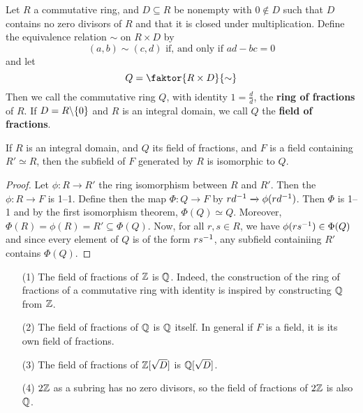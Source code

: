 \begin{definition}
  Let $R$ a commutative ring, and  $D \subseteq R$ be nonempty with $0 \notin
  D$ such that $D$ contains no zero divisors of $R$ and that it is closed
  under multiplication. Define the equivalence relation $\sim$ on  $R \times D$
  by
  \begin{equation*}
    (a,b) \sim (c,d) \text{ if, and only if } ad-bc=0
  \end{equation*}
  and let
  \begin{equation*}
    Q=\faktor{R \times D}{\sim}
  \end{equation*}
  Then we call the commutative ring $Q$, with identity  $1=\frac{d}{d}$, the
  \textbf{ring of fractions} of $R$. If $D=R \backslash \{0\}$ and $R$ is an
  integral domain, we call  $Q$ the \textbf{field of fractions}.
\end{definition}

\begin{lemma}\label{lemma_5.6.3}
  If $R$ is an integral domain, and  $Q$ its field of fractions, and  $F$ is a
  field containing  $R' \simeq R$, then the subfield of $F$ generated by $R$
  is isomorphic to $Q$.
\end{lemma}
\begin{proof}
  Let $\phi:R \xrightarrow{} R'$ the ring isomorphism between $R$ and  $R'$.
  Then the  $\phi:R \xrightarrow{} F$ is 1--1. Define then the map $\Phi:Q
  \xrightarrow{} F$ by $rd^{-1} \xrightarrow{} \phi(rd^{-1})$. Then $\Phi$
  is 1--1 and by the first isomorphism theorem, $\Phi(Q) \simeq Q$. Moreover,
  $\Phi(R)=\phi(R)=R' \subseteq \Phi(Q)$. Now, for all $r,s \in R$, we have
  $\phi(rs^{-1}) \in \Phi(Q)$ and since every element of $Q$ is of the form
  $rs^{-1}$, any subfield containiing $R'$ contains  $\Phi(Q)$.
\end{proof}

\begin{example}\label{example_5.21}
  \begin{enumerate}
    \item[(1)] The field of fractions of $\mathbb{Z}$ is $\mathbb{Q}$. Indeed, the
      construction of the ring of fractions of a commutative ring with
      identity is inspired by constructing $\mathbb{Q}$ from $\mathbb{Z}$.

    \item[(2)] The field of fractions of $\mathbb{Q}$ is $\mathbb{Q}$ itself. In general if
      $F$ is a field, it is its own field of fractions.

    \item [(3)] The field of fractions of $\mathbb{Z}[\sqrt{D}]$ is $\mathbb{Q}[\sqrt{D}]$.

    \item[(4)] $2\mathbb{Z}$ as a subring has no zero divisors, so the field of
      fractions of $2\mathbb{Z}$ is also $\mathbb{Q}$.
  \end{enumerate}
\end{example}
